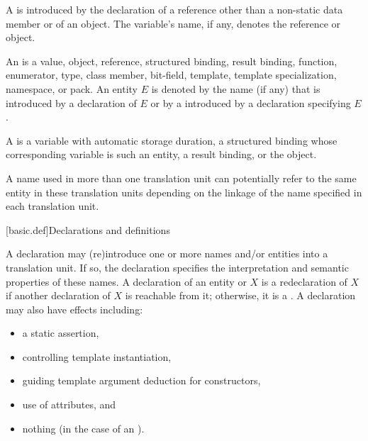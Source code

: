 \pnum
A  is introduced by the
declaration of
a reference other than a non-static data member or of
an object. The variable's name, if any, denotes the reference or object.

\pnum
An  is a value, object, reference,
structured binding,
result binding,
function, enumerator, type,
class member, bit-field, template, template specialization, namespace, or
pack. An entity $E$ is denoted by the name (if any)
that is introduced by a declaration of $E$ or
by a  introduced by a declaration specifying $E$.

\pnum
A  is a variable with
automatic storage duration,
a structured binding
whose corresponding variable is such an entity,
a result binding,
or the  object.

\pnum
{}%
%
A name used in more than one translation unit can potentially
refer to the same entity in these translation units depending on the
linkage of the name specified in each
translation unit.

[basic.def]{Declarations and definitions}

\pnum
{}%
%
%
A declaration may (re)introduce
one or more names and/or entities into a translation
unit.
If so, the
declaration specifies the interpretation and semantic properties of these names.
A declaration of an entity or  $X$ is
a redeclaration of $X$
if another declaration of $X$ is reachable from it;
otherwise, it is a .
A declaration may also have effects including:
\begin{itemize}
\item a static assertion,
\item controlling template instantiation,
\item guiding template argument deduction for constructors,
\item use of attributes, and
\item nothing (in the case of an ).
\end{itemize}

